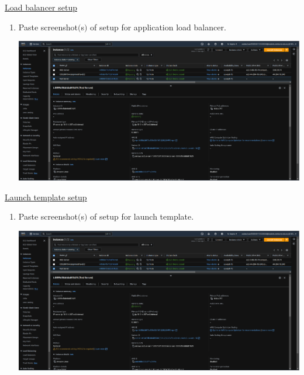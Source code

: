 \documentclass[11pt]{article}
\begin{document}
\noindent\underline{Load balancer setup}

\vspace{0.01cm}

\begin{enumerate}[resume]
    \item Paste screenshot$($s$)$ of setup for application load balancer. \\
    \vspace{-0.02mm}

    {\centering
    \includegraphics[width=5.8in]{pics/40.png}
    }    
        
\end{enumerate}


\noindent\underline{Launch template setup}

\vspace{0.01cm}

\begin{enumerate}[resume]
    \item Paste screenshot$($s$)$ of setup for launch template. \\
    \vspace{-0.02mm}

    {\centering
    \includegraphics[width=5.8in]{pics/40.png}
    }    
        
\end{enumerate}
\end{document}
